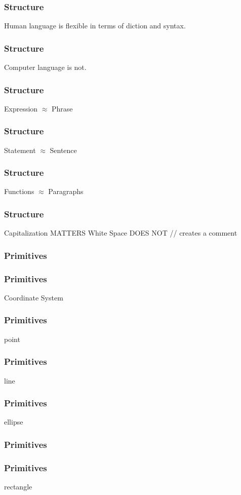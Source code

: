 \documentclass[xcolor=dvipsnames]{beamer}
\begin{document}


\begin{frame}
\frametitle{Structure}
Human language is flexible in terms of diction and syntax.
\end{frame}

\begin{frame}
\frametitle{Structure}
Computer language is not.
\end{frame}

\begin{frame}
\frametitle{Structure}
Expression $\approx$ Phrase
\end{frame}

\begin{frame}
\frametitle{Structure}
Statement $\approx$ Sentence
\end{frame}

\begin{frame}
\frametitle{Structure}
Functions $\approx$ Paragraphs
\end{frame}

\begin{frame}
\frametitle{Structure}
Capitalization MATTERS
White Space DOES NOT
// creates a comment
\end{frame}

\begin{frame}
\frametitle{Primitives}
\end{frame}

\begin{frame}
\frametitle{Primitives}
Coordinate System %
\end{frame}

\begin{frame}
\frametitle{Primitives}
point
\end{frame}

\begin{frame}
\frametitle{Primitives}
line
\end{frame}

\begin{frame}
\frametitle{Primitives}
ellipse
\end{frame}

\begin{frame}
\frametitle{Primitives}

\end{frame}

\begin{frame}
\frametitle{Primitives}
rectangle
\end{frame}
\end{document}
